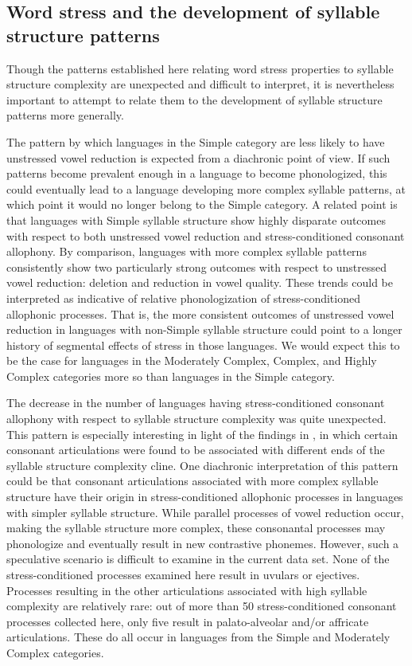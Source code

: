 \subsection{Word stress and the development of syllable structure patterns}\label{sec:5.5.2}\largerpage

  Though the patterns established here relating word stress properties to syllable structure complexity are unexpected and difficult to interpret, it is nevertheless important to attempt to relate them to the development of syllable structure patterns more generally.

  The pattern by which languages in the Simple category are less likely to have unstressed vowel reduction is expected from a diachronic point of view. If such patterns become prevalent enough in a language to become phonologized, this could eventually lead to a language developing more complex syllable patterns, at which point it would no longer belong to the Simple category. A related point is that languages with Simple syllable structure show highly disparate outcomes with respect to both unstressed vowel reduction and stress-conditioned consonant allophony. By comparison, languages with more complex syllable patterns consistently show two particularly strong outcomes with respect to unstressed vowel reduction: deletion and reduction in vowel quality. These trends could be interpreted as indicative of relative phonologization of stress-conditioned allophonic processes. That is, the more consistent outcomes of unstressed vowel reduction in languages with non-Simple syllable structure could point to a longer history of segmental effects of stress in those languages. We would expect this to be the case for languages in the Moderately Complex, Complex, and Highly Complex categories more so than languages in the Simple category. 

  The decrease in the number of languages having stress-conditioned consonant allophony with respect to syllable structure complexity was quite unexpected. This pattern is especially interesting in light of the findings in , in which certain consonant articulations were found to be associated with different ends of the syllable structure complexity cline. One diachronic interpretation of this pattern could be that consonant articulations associated with more complex syllable structure have their origin in stress-conditioned allophonic processes in languages with simpler syllable structure. While parallel processes of vowel reduction occur, making the syllable structure more complex, these consonantal processes may phonologize and eventually result in new contrastive phonemes. However, such a speculative scenario is difficult to examine in the current data set. None of the stress-conditioned processes examined here result in uvulars or ejectives. Processes resulting in the other articulations associated with high syllable complexity are relatively rare: out of more than 50 stress-conditioned consonant processes collected here, only five result in palato-alveolar and/or affricate articulations. These do all occur in languages from the Simple and Moderately Complex categories.\largerpage

